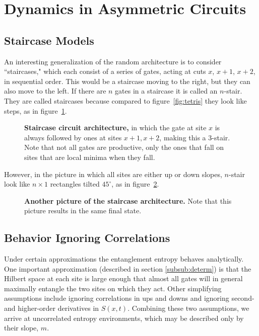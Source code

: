 \section{Dynamics in Asymmetric Circuits} \label{sec:stairs}

\subsection{Staircase Models}\emph{} \label{sub:stairs}

An interesting generalization of the random architecture is to consider ``staircases," which each consist of a series of gates, acting at cuts $x$, $x+1$, $x+2$, in sequential order. This would be a staircase moving to the right, but they can also move to the left. If there are $n$ gates in a staircase it is called an $n$-stair. They are called staircases because compared to figure~\ref{fig:tetris} they look like steps, as in figure~\ref{fig:stairs}. 
\begin{figure}
	\centering
	
	\caption{\textbf{Staircase circuit architecture,} in which the gate at site $x$ is always followed by ones at sites $x+1, x+2$, making this a 3-stair. Note that not all gates are productive, only the ones that fall on sites that are local minima when they fall.}
	\label{fig:stairs}
\end{figure}
However, in the picture in which all sites are either up or down slopes, $n$-stair look like $n\times 1$ rectangles tilted $45^\circ$, as in figure~\ref{fig:diagstairs}.
\begin{figure}
	\centering
	
	\caption{\textbf{Another picture of the staircase architecture.} Note that this picture results in the same final state.}
	\label{fig:diagstairs}
\end{figure}

\subsection{Behavior Ignoring Correlations} \emph{}\label{sub:anal}

Under certain approximations the entanglement entropy behaves analytically. One important approximation (described in section \ref{subsub:determ}) is that the Hilbert space at each site is large enough that almost all gates will in general maximally entangle the two sites on which they act. Other simplifying assumptions include ignoring correlations in ups and downs and ignoring second- and higher-order derivatives in $S(x,t)$. Combining these two assumptions, we arrive at uncorrelated entropy environments, which may be described only by their slope, $m$.

